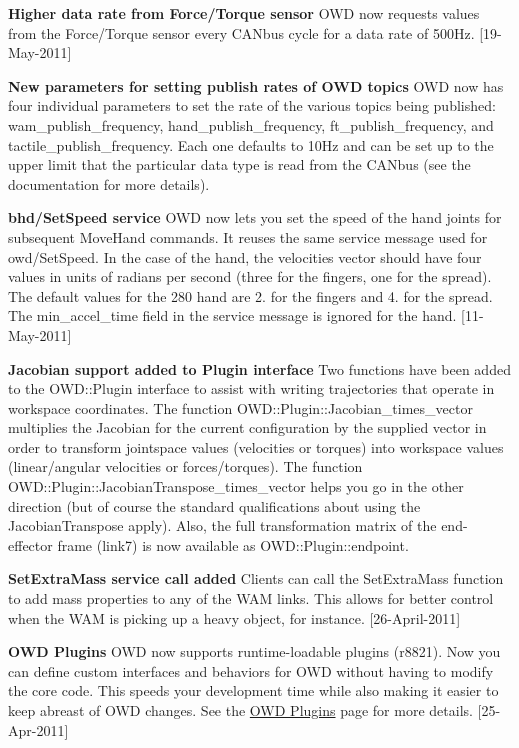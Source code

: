 {\bfseries Higher data rate from Force/\-Torque sensor} O\-W\-D now requests values from the Force/\-Torque sensor every C\-A\-Nbus cycle for a data rate of 500\-Hz. \mbox{[}19-\/\-May-\/2011\mbox{]}

{\bfseries New parameters for setting publish rates of O\-W\-D topics} O\-W\-D now has four individual parameters to set the rate of the various topics being published\-: wam\-\_\-publish\-\_\-frequency, hand\-\_\-publish\-\_\-frequency, ft\-\_\-publish\-\_\-frequency, and tactile\-\_\-publish\-\_\-frequency. Each one defaults to 10\-Hz and can be set up to the upper limit that the particular data type is read from the C\-A\-Nbus (see the documentation for more details).

{\bfseries bhd/\-Set\-Speed service} O\-W\-D now lets you set the speed of the hand joints for subsequent Move\-Hand commands. It reuses the same service message used for owd/\-Set\-Speed. In the case of the hand, the velocities vector should have four values in units of radians per second (three for the fingers, one for the spread). The default values for the 280 hand are 2. for the fingers and 4. for the spread. The min\-\_\-accel\-\_\-time field in the service message is ignored for the hand. \mbox{[}11-\/\-May-\/2011\mbox{]}

{\bfseries Jacobian support added to Plugin interface} Two functions have been added to the O\-W\-D\-::\-Plugin interface to assist with writing trajectories that operate in workspace coordinates. The function O\-W\-D\-::\-Plugin\-::\-Jacobian\-\_\-times\-\_\-vector multiplies the Jacobian for the current configuration by the supplied vector in order to transform jointspace values (velocities or torques) into workspace values (linear/angular velocities or forces/torques). The function O\-W\-D\-::\-Plugin\-::\-Jacobian\-Transpose\-\_\-times\-\_\-vector helps you go in the other direction (but of course the standard qualifications about using the Jacobian\-Transpose apply). Also, the full transformation matrix of the end-\/effector frame (link7) is now available as O\-W\-D\-::\-Plugin\-::endpoint.

{\bfseries Set\-Extra\-Mass service call added} Clients can call the Set\-Extra\-Mass function to add mass properties to any of the W\-A\-M links. This allows for better control when the W\-A\-M is picking up a heavy object, for instance. \mbox{[}26-\/\-April-\/2011\mbox{]}

{\bfseries O\-W\-D Plugins} O\-W\-D now supports runtime-\/loadable plugins (r8821). Now you can define custom interfaces and behaviors for O\-W\-D without having to modify the core code. This speeds your development time while also making it easier to keep abreast of O\-W\-D changes. See the \hyperlink{plugins}{O\-W\-D Plugins} page for more details. \mbox{[}25-\/\-Apr-\/2011\mbox{]}

